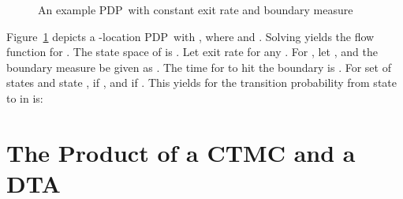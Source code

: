 \documentclass{LMCS}
\newcommand{\<}{\langle}
\renewcommand{\>}{\rangle}
\newcommand{\PDP}{\textsc{PDP}}
\begin{document}
\begin{figure} \begin{center}\end{center}\vspace{-0.3cm}\caption{An example \PDP\ with constant exit rate
 and boundary measure \label{fig:PDP}}
\end{figure}

\begin{exa}
Figure~\ref{fig:PDP} depicts a -location \PDP\  with ,
where  and .
Solving  yields the flow function 
for .
The state space of  is .
Let exit rate  for any .
For , let
,
 and the
boundary measure be given as .
The time for  to hit the boundary is .
For set of states  and state ,
 if , and
 if .
This yields for the transition probability from state  to  in
 is:

\end{exa}

\section{The Product of a CTMC and a DTA}\label{sec:DTA}
\end{document}
